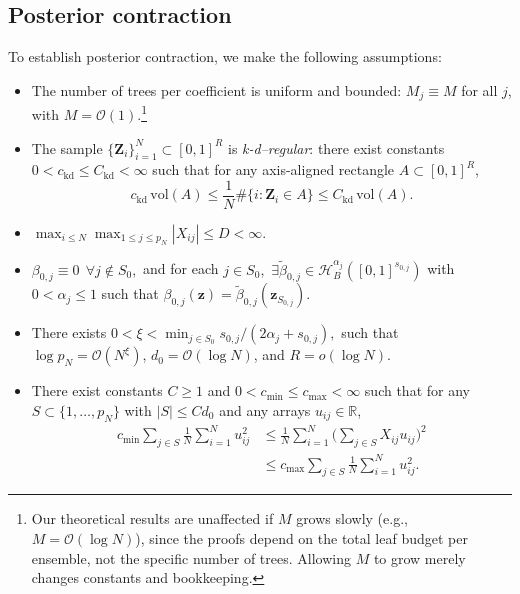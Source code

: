 \documentclass[11pt]{article}
\theoremstyle{plain}
\theoremstyle{definition}
\theoremstyle{plain}
\begin{document}
\subsection{Posterior contraction}
\label{sec:postconc}
To establish posterior contraction, we make the following assumptions:
\begin{itemize}
   \item[\textbf{(A1)}]The number of trees per coefficient is uniform and bounded: $M_{j} \equiv M$ for all $j$, with $M=\mathcal O(1)$.\footnote{Our theoretical results are unaffected if $M$ grows slowly (e.g., $M = \mathcal O(\log N)$), since the proofs depend on the total leaf budget per ensemble, not the specific number of trees. Allowing $M$ to grow merely changes constants and bookkeeping.}

   \item[\textbf{(A2)}] The sample $\{\bm Z_i\}_{i=1}^N\subset[0,1]^R$ is \emph{k-d–regular}:   
    there exist constants $0<c_\mathrm{kd}\le C_\mathrm{kd}<\infty$ such that for any axis-aligned rectangle $A\subset[0,1]^R$,
\[
c_\mathrm{kd}\,\mathrm{vol}(A)
\le
\frac{1}{N}\#\{i:\bm Z_i\in A\}
\le
C_\mathrm{kd}\,\mathrm{vol}(A).
\] 
\item[\textbf{(A3)}] $\max_{i\le N}\max_{1\le j\le p_N}|X_{ij}|\le D<\infty$.
\item[\textbf{(A4)}] $\beta_{0,j} \equiv 0 \ \  \forall j \notin S_0,$ and for each $j \in S_0,$ $\exists \tilde{\beta}_{0,j} \in \mathcal{H}_{B} ^{\alpha_j} \left([0,1]^{s_{0,j}}\right)$ with $0 < \alpha_j \le 1$ such that $\beta_{0,j}(\bm z) = \tilde{\beta}_{0,j}(\bm{z}_{S_{0,j}}).$

\item[\textbf{(A5)}] There exists $0<\xi<\min_{j \in S_0} s_{0,j}/(2 \alpha_j + s_{0,j}),$ such that $\log p_N=\mathcal O(N^\xi)$, $d_0=\mathcal O(\log N)$, and $R=o(\log N)$.

\item[\textbf{(A6)}] There exist constants $C\ge 1$ and $0<c_{\min}\le c_{\max}<\infty$ such that for any
$S\subset\{1,\dots,p_N\}$ with $|S|\le C d_0$ and any arrays $u_{ij}\in\mathbb R$,
\begin{equation*}
\begin{split}
c_{\min}\sum_{j\in S}\frac{1}{N}\sum_{i=1}^N u_{ij}^2
 & \le
\frac{1}{N}\sum_{i=1}^N\Big(\sum_{j\in S} X_{ij} u_{ij}\Big)^2 \\
& \le
c_{\max}\sum_{j\in S}\frac{1}{N}\sum_{i=1}^N u_{ij}^2.
\end{split}
\end{equation*}
\end{itemize}
\end{document}
